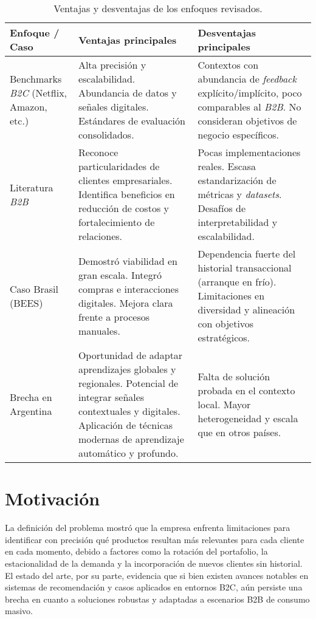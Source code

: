 \begin{table}[H]
\centering
\caption[Ventajas y desventajas de enfoques en recomendación]{Ventajas y desventajas de los enfoques revisados.}
\label{tab:estado_arte}
\begin{tabularx}{\textwidth}{>{\hsize=0.5\hsize}X >{\hsize=1.25\hsize}X >{\hsize=1.25\hsize}X}
\toprule
Enfoque / Caso & Ventajas principales & Desventajas principales \\
\midrule
Benchmarks \emph{B2C} (Netflix, Amazon, etc.) &
Alta precisión y escalabilidad. Abundancia de datos y señales digitales. Estándares de evaluación consolidados. &
Contextos con abundancia de \emph{feedback} explícito/implícito, poco comparables al \emph{B2B}. No consideran objetivos de negocio específicos. \\
\midrule
Literatura \emph{B2B} &
Reconoce particularidades de clientes empresariales. Identifica beneficios en reducción de costos y fortalecimiento de relaciones. &
Pocas implementaciones reales. Escasa estandarización de métricas y \emph{datasets}. Desafíos de interpretabilidad y escalabilidad. \\
\midrule
Caso Brasil (BEES) &
Demostró viabilidad en gran escala. Integró compras e interacciones digitales. Mejora clara frente a procesos manuales. &
Dependencia fuerte del historial transaccional (arranque en frío). Limitaciones en diversidad y alineación con objetivos estratégicos. \\
\midrule
Brecha en Argentina &
Oportunidad de adaptar aprendizajes globales y regionales. Potencial de integrar señales contextuales y digitales. Aplicación de técnicas modernas de aprendizaje automático y profundo. &
Falta de solución probada en el contexto local. Mayor heterogeneidad y escala que en otros países. \\
\bottomrule
\end{tabularx}
\end{table}


\section{Motivación}

La definición del problema mostró que la empresa enfrenta limitaciones para identificar con precisión qué productos resultan más relevantes para cada cliente en cada momento, debido a factores como la rotación del portafolio, la estacionalidad de la demanda y la incorporación de nuevos clientes sin historial. El estado del arte, por su parte, evidencia que si bien existen avances notables en sistemas de recomendación y casos aplicados en entornos B2C, aún persiste una brecha en cuanto a soluciones robustas y adaptadas a escenarios B2B de consumo masivo.


